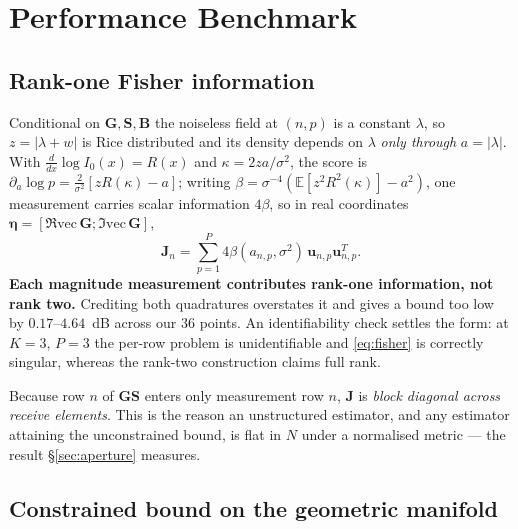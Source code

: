 \documentclass[journal]{IEEEtran}
\newcommand{\bG}{\mathbf{G}}
\newcommand{\bS}{\mathbf{S}}
\newcommand{\bB}{\mathbf{B}}
\newcommand{\bJ}{\mathbf{J}}
\begin{document}
\section{Performance Benchmark}
\label{sec:crlb}

\subsection{Rank-one Fisher information}

Conditional on $\bG,\bS,\bB$ the noiseless field at $(n,p)$ is a constant
$\lambda$, so $z=|\lambda+w|$ is Rice distributed and its density depends on
$\lambda$ \emph{only through} $a=|\lambda|$. With
$\frac{d}{dx}\log I_0(x)=R(x)$ and $\kappa=2za/\sigma^2$, the score is
$\partial_a\log p=\frac{2}{\sigma^2}[zR(\kappa)-a]$; writing
$\beta=\sigma^{-4}(\mathbb{E}[z^2R^2(\kappa)]-a^2)$, one measurement carries
scalar information $4\beta$, so in real coordinates
$\boldsymbol\eta=[\Re\mathrm{vec}\,\bG;\Im\mathrm{vec}\,\bG]$,
\begin{equation}
\bJ_n=\sum_{p=1}^{P}4\beta(a_{n,p},\sigma^2)\,
\mathbf{u}_{n,p}\mathbf{u}_{n,p}^{T}.
\label{eq:fisher}
\end{equation}
\textbf{Each magnitude measurement contributes rank-one information, not rank
two.} Crediting both quadratures overstates it and gives a bound too low by
$0.17$--$4.64$~dB across our $36$ points. An identifiability check settles the
form: at $K=3$, $P=3$ the per-row problem is unidentifiable and
\eqref{eq:fisher} is correctly singular, whereas the rank-two construction
claims full rank.

Because row $n$ of $\bG\bS$ enters only measurement row $n$, $\bJ$ is
\emph{block diagonal across receive elements}. This is the reason an
unstructured estimator, and any estimator attaining the unconstrained bound, is
flat in $N$ under a normalised metric --- the result \S\ref{sec:aperture}
measures.

\subsection{Constrained bound on the geometric manifold}
\end{document}
